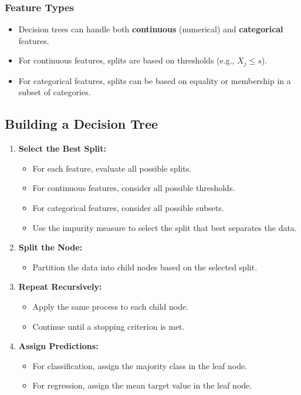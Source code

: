 \documentclass{article}
\begin{document}
\subsubsection{Feature Types}

\begin{itemize}
    \item Decision trees can handle both \textbf{continuous} (numerical) and \textbf{categorical} features.
    \item For continuous features, splits are based on thresholds (e.g., $X_j \leq s$).
    \item For categorical features, splits can be based on equality or membership in a subset of categories.
\end{itemize}

\subsection{Building a Decision Tree}

\begin{enumerate}
    \item \textbf{Select the Best Split:}
    \begin{itemize}
        \item For each feature, evaluate all possible splits.
        \item For continuous features, consider all possible thresholds.
        \item For categorical features, consider all possible subsets.
        \item Use the impurity measure to select the split that best separates the data.
    \end{itemize}
    \item \textbf{Split the Node:}
    \begin{itemize}
        \item Partition the data into child nodes based on the selected split.
    \end{itemize}
    \item \textbf{Repeat Recursively:}
    \begin{itemize}
        \item Apply the same process to each child node.
        \item Continue until a stopping criterion is met.
    \end{itemize}
    \item \textbf{Assign Predictions:}
    \begin{itemize}
        \item For classification, assign the majority class in the leaf node.
        \item For regression, assign the mean target value in the leaf node.
    \end{itemize}
\end{enumerate}
\end{document}

